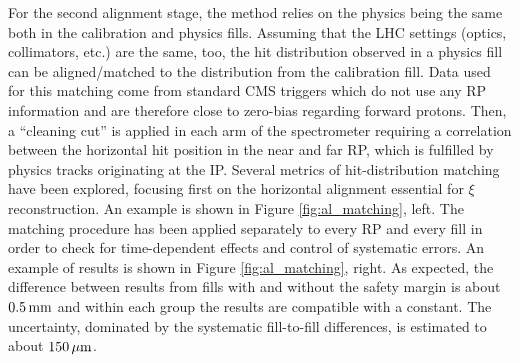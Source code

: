 \documentclass{article}
\def\un#1{\,{\rm #1}}
\begin{document}
For the second alignment stage, the method relies on the physics being the same both in the calibration and physics fills. Assuming that the LHC settings (optics, collimators, etc.) are the same, too, the hit distribution observed in a physics fill can be aligned/matched to the distribution from the calibration fill. Data used for this matching come from standard CMS triggers which do not use any RP information and are therefore close to zero-bias regarding forward protons. Then, a ``cleaning cut'' is applied in each arm of the spectrometer requiring a correlation between the horizontal hit position in the near and far RP, which is fulfilled by physics tracks originating at the IP. Several metrics of hit-distribution matching have been explored, focusing first on the horizontal alignment essential for $\xi$ reconstruction. An example is shown in Figure \ref{fig:al_matching}, left. The matching procedure has been applied separately to every RP and every fill in order to check for time-dependent effects and control of systematic errors. An example of results is shown in Figure \ref{fig:al_matching}, right. As expected, the difference between results from fills with and without the safety margin is about $0.5\un{mm}$ and within each group the results are compatible with a constant. The uncertainty, dominated by the systematic fill-to-fill differences, is estimated to about $150\un{\mu m}$.
\end{document}
